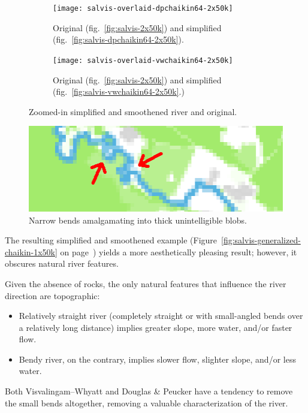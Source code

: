\documentclass[a4paper]{article}
\newcommand{\onpage}[1]{\ref{#1} on page~\pageref{#1}}
\newcommand{\DP}{Douglas \& Peucker}
\newcommand{\VW}{Visvalingam--Whyatt}
\begin{document}
\begin{figure}[ht!]
    \centering
    \begin{subfigure}[b]{.49\textwidth}
        \texttt{[image: salvis-overlaid-dpchaikin64-2x50k]}

        \caption{Original (fig.~\ref{fig:salvis-2x50k}) and simplified
        (fig.~\ref{fig:salvis-dpchaikin64-2x50k}).}

    \end{subfigure}
    \hfill
    \begin{subfigure}[b]{.49\textwidth}
        \texttt{[image: salvis-overlaid-vwchaikin64-2x50k]}

        \caption{Original (fig.~\ref{fig:salvis-2x50k}) and simplified
            (fig.~\ref{fig:salvis-vwchaikin64-2x50k}.)}

    \end{subfigure}
    \caption{Zoomed-in simplified and smoothened river and original.}
    \label{fig:salvis-overlaid-generalized-chaikin-1x50k}
\end{figure}

\begin{figure}[b!]
    \centering
    \includegraphics[width=.9\textwidth]{amalgamate1}
    \caption{Narrow bends amalgamating into thick unintelligible blobs.}
    \label{fig:pixel-amalgamation}
\end{figure}

The resulting simplified and smoothened example
(Figure~\onpage{fig:salvis-generalized-chaikin-1x50k}) yields a more
aesthetically pleasing result; however, it obscures natural river features.

Given the absence of rocks, the only natural features that influence the river
direction are topographic:

\begin{itemize}
    \item Relatively straight river (completely straight or with small-angled
        bends over a relatively long distance) implies greater slope, more
        water, and/or faster flow.

    \item Bendy river, on the contrary, implies slower flow, slighter slope,
        and/or less water.

\end{itemize}
Both {\VW} and {\DP} have a tendency to remove the small bends altogether,
removing a valuable characterization of the river.
\end{document}
